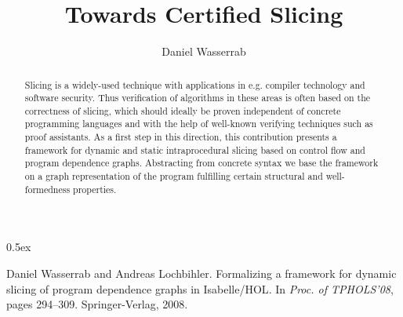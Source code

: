 \documentclass[11pt,a4paper,notitlepage]{report}
\begin{document}
\title{Towards Certified Slicing}
\author{Daniel Wasserrab}
\maketitle

\begin{abstract}
Slicing is a widely-used technique with applications in e.g. compiler
technology and software security. Thus verification of
algorithms in these areas is often based on the correctness of slicing,
which should ideally be proven independent of concrete programming
languages and with the help of well-known verifying techniques such as
proof assistants. As a first step in this direction, this contribution
presents a framework for dynamic and static intraprocedural slicing 
based on control flow and program dependence graphs.
Abstracting from concrete syntax we base the framework on a graph
representation of the program fulfilling certain structural
and well-formedness properties.
\end{abstract}

\parindent 0pt\parskip 0.5ex



%
%
\begin{thebibliography}{10}

Daniel Wasserrab and Andreas Lochbihler.
\newblock Formalizing a framework for dynamic slicing of program dependence
  graphs in {Isabelle/HOL}.
\newblock In {\em Proc. of TPHOLS'08}, pages 294--309. Springer-Verlag, 2008.

\end{thebibliography}
\end{document}
